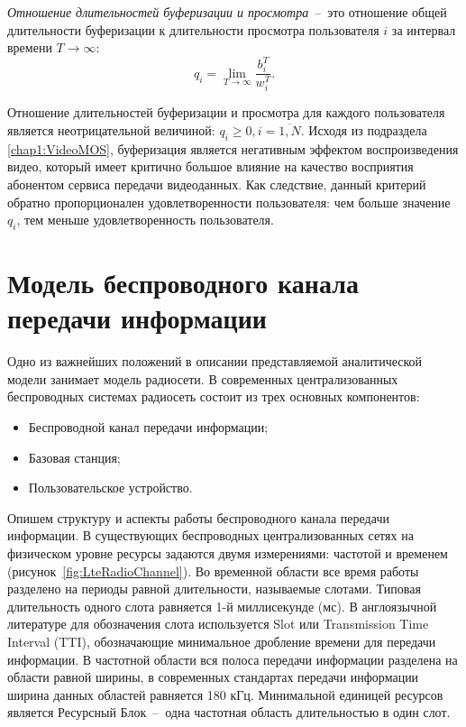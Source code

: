 \begin{definition}
\label{def:BWTR}
    \emph{Отношение длительностей буферизации и просмотра}~--~это отношение общей длительности буферизации к длительности просмотра пользователя $i$ за интервал времени $T\rightarrow\infty$:
    $$q_i = \lim\limits_{T\rightarrow\infty} \frac{b_i^T}{w_i^T}.$$
\end{definition}

Отношение длительностей буферизации и просмотра для каждого пользователя является неотрицательной величиной: $q_i \geq 0, i=\overline{1,N}.$ Исходя из подраздела \ref{chap1:VideoMOS}, буферизация является негативным эффектом воспроизведения видео, который имеет критично большое влияние на качество восприятия абонентом сервиса передачи видеоданных. Как следствие, данный критерий обратно пропорционален удовлетворенности пользователя: чем больше значение $q_i$, тем меньше удовлетворенность пользователя.

\section{Модель беспроводного канала передачи информации}
\label{chap2:RadioChannel}

Одно из важнейших положений в описании представляемой аналитической модели занимает модель радиосети. В современных централизованных беспроводных системах радиосеть состоит из трех основных компонентов:
\begin{itemize}
	\item Беспроводной канал передачи информации;
	\item Базовая станция;
	\item Пользовательское устройство.
\end{itemize}

Опишем структуру и аспекты работы беспроводного канала передачи информации. В существующих беспроводных централизованных сетях на физическом уровне ресурсы задаются двумя измерениями: частотой и временем (рисунок~\ref{fig:LteRadioChannel}). Во временной области все время работы разделено на периоды равной длительности, называемые слотами. Типовая длительность одного слота равняется 1-й миллисекунде (мс). В англоязычной литературе для обозначения слота используется Slot или Transmission Time Interval (TTI), обозначающие минимальное дробление времени для передачи информации. В частотной области вся полоса передачи информации разделена на области равной ширины, в современных стандартах передачи информации ширина данных областей равняется 180 кГц. Минимальной единицей ресурсов является Ресурсный Блок~--~одна частотная область длительностью в один слот.

